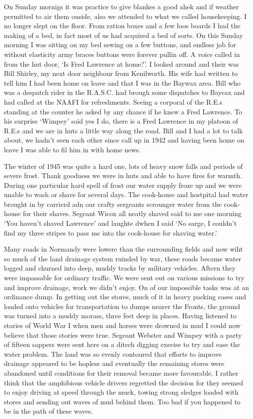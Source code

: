 On Sunday mornigs it was practice to give blankes a good ahek and if
weather permitted to air them ouside, also we attended to what we
called housekeeping. I no longer slept on the floor. From ration boxes
and a few loos boards I had the making of a bed, in fact most of us
had acquired a bed of sorts. On this Sunday morning I was sitting on
my bed sewing on a few buttons, and endless job for without elasticity
army braces buttons were forever pullin off. A voice called in from
the hut door, `Is Fred Lawrence at home?'. I looked around and their
was Bill Shirley, my next door neighbour from Kenilworth. His wife had
written to tell him I had been home on leave and that I was in the
Baywax area. Bill who was a despatch rider in the R.A.S.C. had brough
some dispatches to Bayeax and had called at the NAAFI for
refreshments. Seeing a corporal of the R.E.s standing at the counter
he asked by any chance if he knew a Fred Lawrence. To his surprise
\corporal `Wimpey' said yes I do, there is a Fred Lawrence in my
platoon of R.E.s and we are in huts a little way along the road. Bill
and I had a lot to talk about, we hadn't seen each other since call up
in 1942 and having been home on leave I was able to fil him in with
home news.

The winter of 1945 was quite a hard one, lots of heavy snow falls and
periods of severe frost. Thank goodness we were in huts and able to
have fires for warmth. During one particular hard spell of frost our
water supply froze up and we were unable to wash or shave for several
days. The cook-house and hostpital had water brought in by carrierd adn
our crafty sergeants scrounger water from the cook-house for their
shaves. Segeant Wicox all neatly shaved said to me one morning `You
haven't shaved Lawrence' and laughte dwhen I said `No sarge, I
couldn't find my three stripes to pass me into the cook-house for
shaving water.'

Many roads in Normandy were lowere than the surrounding fields and now
wiht so much of the land drainage system ruinded by war, these roads
became water logged and churned into deep, muddy tracks by military
vehicles. Aftern they were impassable for ordinary traffic. We were
sent out on various missions to try and improve drainage, work we
didn't enjoy. On of our impossible tasks was at an ordinance dump. In
getting out the stores, much of it in heavy packing cases and loaded
onto vehicles for transportation to dumps nearer the Fronts, the
ground was turned into a muddy morass, three feet deep in
places. Having listened to stories of World War I when men and horses
were drowned in mud I could now believe that those stories were
true. Segeant Webster and \corporal Wimpey with a party of fifteen
sappers were sent here on a ditech digging execise to try and ease the
water problem. The land was so evenly contoured that efforts to
improve drainage appeared to be hopless and eventually the remaining
stores were abandoned until conditions for their removal became more
favourable. I rather think that the amphibious vehicle drivers
regretted the decision for they seemed to enjoy driving at speed
through the muck, towing strong sledges loaded with stores and sending
out waves of mud behind them. Too bad if you happened to be in the
path of these waves.

